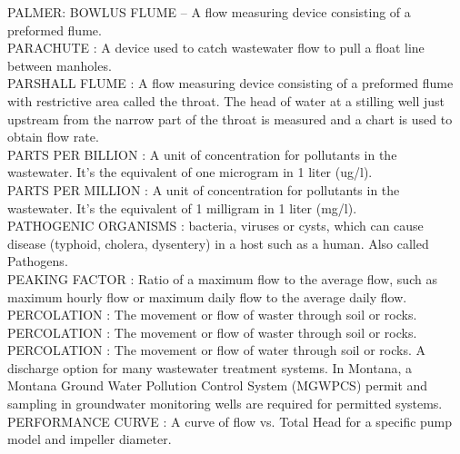 \vspace{0.15cm}
PALMER: BOWLUS FLUME – A flow measuring device consisting of a preformed flume.\\
\vspace{0.15cm}
PARACHUTE :  A device used to catch wastewater flow to pull a float line between manholes. \\
\vspace{0.15cm}
PARSHALL FLUME :  A flow measuring device consisting of a preformed flume with restrictive area called the throat. The head of water at a stilling well just upstream from the narrow part of the throat is measured and a chart is used to obtain flow rate.\\
\vspace{0.15cm}
PARTS PER BILLION :   A unit of concentration for pollutants in the wastewater. It’s the equivalent of one microgram in 1 liter (ug/l).\\
\vspace{0.15cm}
PARTS PER MILLION :   A unit of concentration for pollutants in the wastewater. It’s the equivalent of 1 milligram in 1 liter (mg/l).\\
\vspace{0.15cm}
PATHOGENIC ORGANISMS :  bacteria, viruses or cysts, which can cause disease (typhoid, cholera, dysentery) in a host such as a human.  Also called Pathogens.\\
\vspace{0.15cm}
PEAKING FACTOR :  Ratio of a maximum flow to the average flow, such as maximum hourly flow or maximum daily flow to the average daily flow. \\
\vspace{0.15cm}
PERCOLATION :  The movement or flow of waster through soil or rocks.\\
\vspace{0.15cm}
PERCOLATION :  The movement or flow of waster through soil or rocks.\\
\vspace{0.15cm}
PERCOLATION :  The movement or flow of water through soil or rocks. A discharge option for many wastewater treatment systems. In Montana, a Montana Ground Water Pollution Control System (MGWPCS) permit and sampling in groundwater monitoring wells are required for permitted systems.\\
\vspace{0.15cm}
PERFORMANCE CURVE :   A curve of flow vs. Total Head for a specific pump model and impeller diameter.\\
\vspace{0.15cm}

